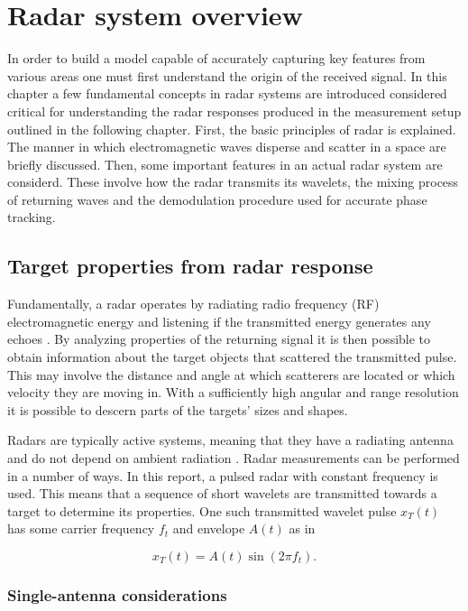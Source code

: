 \chapter{Radar system overview}

In order to build a model capable of accurately capturing key features from various areas one must first understand the origin of the received signal. In this chapter a few fundamental concepts in radar systems are introduced considered critical for understanding the radar responses produced in the measurement setup outlined in the following chapter. First, the basic principles of radar is explained. The manner in which electromagnetic waves disperse and scatter in a space are briefly discussed. Then, some important features in an actual radar system are considerd. These involve how the radar transmits its wavelets, the mixing process of returning waves and the demodulation procedure used for accurate phase tracking. 

\section{Target properties from radar response}

Fundamentally, a radar operates by radiating radio frequency (RF) electromagnetic energy and listening if the transmitted energy generates any echoes \citep{skolnik_2009}. By analyzing properties of the returning signal it is then possible to obtain information about the target objects that scattered the transmitted pulse. This may involve the distance and angle at which scatterers are located or which velocity they are moving in. With a sufficiently high angular and range resolution it is possible to descern parts of the targets' sizes and shapes.  

Radars are typically active systems, meaning that they have a radiating antenna and do not depend on ambient radiation \citep{skolnik_2009}. Radar measurements can be performed in a number of ways. In this report, a pulsed radar with constant frequency is used. This means that a sequence of short wavelets are transmitted towards a target to determine its properties. One such transmitted wavelet pulse $x_T(t)$ has some carrier frequency $f_t$ and envelope $A(t)$ as in

\begin{equation}
	x_T(t)
	= A(t)\sin(2\pi f_t).
\end{equation}

\subsection{Single-antenna considerations}

